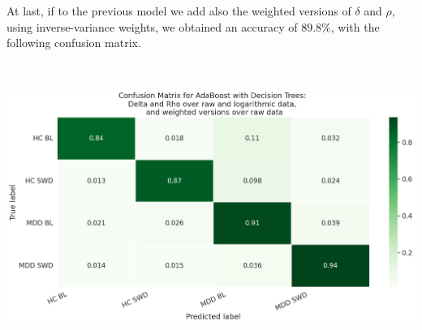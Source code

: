 \documentclass{article}
\begin{document}
\justifying
\begin{multicols}{2}

At last, if to the previous model we add also the weighted versions of $\delta$
and $\rho$, using inverse-variance weights, we obtained an accuracy of $89.8\%$,
with the following confusion matrix.

\end{multicols}

\centering
~

\includegraphics[scale=0.4]{final-cm}
\end{document}
